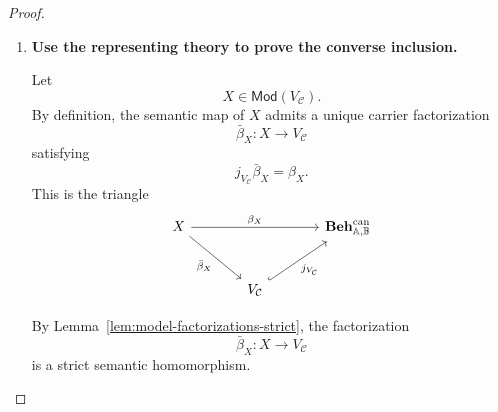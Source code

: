 \begin{proof}
\begin{enumerate}
        Let
        \[
            P\in\mathcal C.
        \]
        By construction,
        \[
            \operatorname{Beh}(P)\leq V_{\mathcal C}.
        \]
        The semantic map factors through its regular image:
        \[
            P
            \twoheadrightarrow
            \operatorname{Beh}(P)
            \hookrightarrow
            \mathbf{Beh}^{\mathrm{can}}.
        \]
        Composing the semantic-image inclusion with
        \[
            \operatorname{Beh}(P)\hookrightarrow V_{\mathcal C}
        \]
        gives a factorization of \(\beta_P\) through \(V_{\mathcal C}\):
        \[
        \begin{tikzcd}[column sep=large, row sep=large]
            P
                \arrow[r, two heads]
                \arrow[rrr, bend left=18, "\beta_P"]
            &
            \operatorname{Beh}(P)
                \arrow[r, hook]
            &
            V_{\mathcal C}
                \arrow[r, hook, "j_{V_{\mathcal C}}"]
            &
            \mathbf{Beh}^{\mathrm{can}} .
        \end{tikzcd}
        \]
        Hence
        \[
            P\models V_{\mathcal C}.
        \]
        Therefore
        \[
            \mathcal C
            \subseteq
            \mathsf{Mod}(V_{\mathcal C}).
        \]

        \item \textbf{Use the representing theory to prove the converse
        inclusion.}

        Let
        \[
            X\in\mathsf{Mod}(V_{\mathcal C}).
        \]
        By definition, the semantic map of \(X\) admits a unique carrier
        factorization
        \[
            \bar\beta_X:
            X\to V_{\mathcal C}
        \]
        satisfying
        \[
            j_{V_{\mathcal C}}\bar\beta_X
            =
            \beta_X.
        \]
        This is the triangle
        \[
        \begin{tikzcd}[column sep=large, row sep=large]
            X
                \arrow[rr, "\beta_X"]
                \arrow[dr, "\bar\beta_X"']
            &&
            \mathbf{Beh}^{\mathrm{can}}_{\mathbb A,\mathbb B}
            \\
            &
            V_{\mathcal C}
                \arrow[ur, hook, "j_{V_{\mathcal C}}"']
            &
        \end{tikzcd}
        \]

        By Lemma~\ref{lem:model-factorizations-strict}, the factorization
        \[
            \bar\beta_X:X\to V_{\mathcal C}
        \]
        is a strict semantic homomorphism.


\end{enumerate}
\end{proof}

